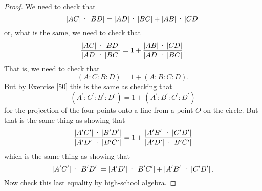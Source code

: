 \begin{proof}
We need to check that%
\[
\left\vert AC\right\vert \text{\textperiodcentered}\left\vert BD\right\vert
=\left\vert AD\right\vert \text{\textperiodcentered}\left\vert BC\right\vert
+\left\vert AB\right\vert \text{\textperiodcentered}\left\vert CD\right\vert
\]
or, what is the same, we need to check that%
\[
\frac{\left\vert AC\right\vert \text{\textperiodcentered}\left\vert
BD\right\vert }{\left\vert AD\right\vert \text{\textperiodcentered}\left\vert
BC\right\vert }=1+\frac{\left\vert AB\right\vert \text{\textperiodcentered
}\left\vert CD\right\vert }{\left\vert AD\right\vert \text{\textperiodcentered
}\left\vert BC\right\vert }.
\]
That is, we need to check that
\[
\left(  A:C:B:D\right)  =1+\left(  A:B:C:D\right)  .
\]
But by Exercise \ref{50} this is the same as checking that%
\[
\left(  A^{\prime}:C^{\prime}:B^{\prime}:D^{\prime}\right)  =1+\left(
A^{\prime}:B^{\prime}:C^{\prime}:D^{\prime}\right)
\]
for the projection of the four points onto a line from a point $O$ on the
circle. But that is the same thing as showing that
\[
\frac{\left\vert A^{\prime}C^{\prime}\right\vert \text{\textperiodcentered
}\left\vert B^{\prime}D^{\prime}\right\vert }{\left\vert A^{\prime}D^{\prime
}\right\vert \text{\textperiodcentered}\left\vert B^{\prime}C^{\prime
}\right\vert }=1+\frac{\left\vert A^{\prime}B^{\prime}\right\vert
\text{\textperiodcentered}\left\vert C^{\prime}D^{\prime}\right\vert
}{\left\vert A^{\prime}D^{\prime}\right\vert \text{\textperiodcentered
}\left\vert B^{\prime}C^{\prime}\right\vert }%
\]
which is the same thing as showing that%
\[
\left\vert A^{\prime}C^{\prime}\right\vert \text{\textperiodcentered
}\left\vert B^{\prime}D^{\prime}\right\vert =\left\vert A^{\prime}D^{\prime
}\right\vert \text{\textperiodcentered}\left\vert B^{\prime}C^{\prime
}\right\vert +\left\vert A^{\prime}B^{\prime}\right\vert
\text{\textperiodcentered}\left\vert C^{\prime}D^{\prime}\right\vert .
\]
Now check this last equality by high-school algebra.
\end{proof}
